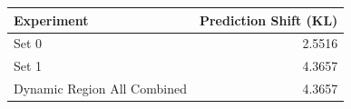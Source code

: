 \begin{tabular}{lr}
\toprule
Experiment & Prediction Shift (KL) \\
\midrule
Set 0 & 2.5516 \\
Set 1 & 4.3657 \\
Dynamic Region All Combined & 4.3657 \\
\bottomrule
\end{tabular}

